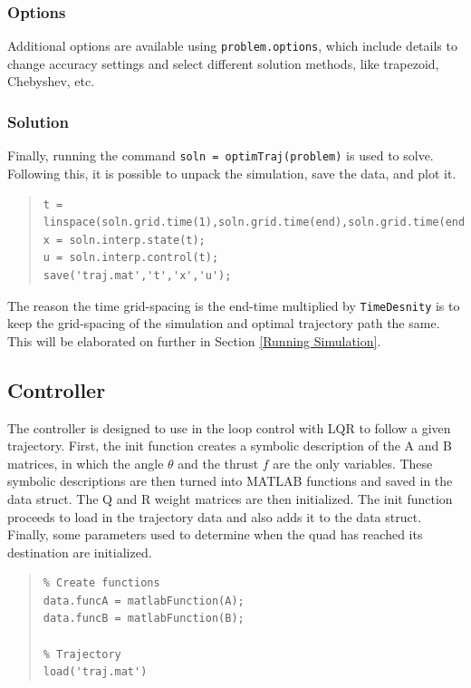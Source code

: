 \documentclass[12pt]{article}
\begin{document}
\subsubsection{Options}
Additional options are available using \lstinline!problem.options!, which include details to change accuracy settings and select different solution methods, like trapezoid, Chebyshev, etc.
\subsubsection{Solution}
Finally, running the command \lstinline!soln = optimTraj(problem)! is used to solve. Following this, it is possible to unpack the simulation, save the data, and plot it.
\begin{quote}
\begin{lstlisting}
t = linspace(soln.grid.time(1),soln.grid.time(end),soln.grid.time(end)*TimeDensity);
x = soln.interp.state(t);
u = soln.interp.control(t);
save('traj.mat','t','x','u');
\end{lstlisting}
\end{quote}

The reason the time grid-spacing is the end-time multiplied by \lstinline!TimeDesnity! is to keep the grid-spacing of the simulation and optimal trajectory path the same. This will be elaborated on further in Section \ref{Running Simulation}.

\subsection{Controller}
The controller is designed to use in the loop control with LQR to follow a given trajectory. First, the init function creates a symbolic description of the A and B matrices, in which the angle $\theta$ and the thrust $f$ are the only variables.  These symbolic descriptions are then turned into MATLAB functions and saved in the data struct.  The Q and R weight matrices are then initialized.  The init function proceeds to load in the trajectory data and also adds it to the data struct.  Finally, some parameters used to determine when the quad has reached its destination are initialized.
\begin{quote}
\begin{lstlisting}
% Create functions
data.funcA = matlabFunction(A);
data.funcB = matlabFunction(B);

% Trajectory
load('traj.mat')
\end{lstlisting}
\end{quote}
\end{document}
